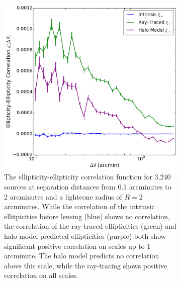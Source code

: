 \documentclass[%
 reprint,
 amsmath,amssymb,
 aps,nofootinbib
]{revtex4-1}
\begin{document}
\begin{figure}
    \centering
    \begin{subfigure}[h]{0.475\textwidth}
        \includegraphics[width=\textwidth]{figs-swe/gg_corr.png}
        \captionsetup{justification=raggedright,singlelinecheck=false}
        \caption{The ellipticity-ellipticity correlation function for 3,240 sources at separation distances from 0.1 arcminutes to 2 arcminutes and a lightcone radius of $R=2$ arcminutes. While the correlation of the intrinsic ellitpicities before lensing (blue) shows no correlation, the correlation of the ray-traced ellipticities (green) and halo model predicted ellipticities (purple) both show significant positive correlation on scales up to 1 arcminute. The halo model predicts no correlation above this scale, while the ray-tracing shows positive correlation on all scales.}
        \label{gg_corr}
    \end{subfigure}
    ~~
    \begin{subfigure}[h]{0.475\textwidth}

\end{subfigure}
\end{figure}
\end{document}
